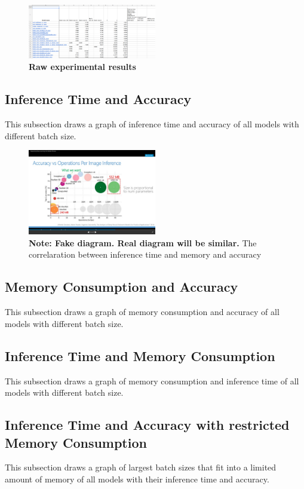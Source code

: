 \documentclass[conference]{IEEEtran}
\begin{document}
\begin{figure}[htpb]
	  \centering
	  \includegraphics[width=0.5\textwidth]{experimental_results}
	  \caption{\textbf{Raw experimental results}}
	  \label{fig:experimental_results}
\end{figure}

\subsection{Inference Time and Accuracy}
This subsection draws a graph of inference time and accuracy of all models with different batch size.

\begin{figure}[htpb]
	  \centering
	  \includegraphics[width=0.5\textwidth]{time-memory-accuracy}
	  \caption{\textbf{Note: Fake diagram. Real diagram will be similar.} The correlaration between inference time and memory and accuracy}
	  \label{fig:time-memory-accuracy}
\end{figure}


\subsection{Memory Consumption and Accuracy}
This subsection draws a graph of memory consumption and accuracy of all models with different batch size.

\subsection{Inference Time and Memory Consumption}
This subsection draws a graph of memory consumption and inference time of all models with different batch size.

\subsection{Inference Time and Accuracy with restricted Memory Consumption}
This subsection draws a graph of largest batch sizes that fit into a limited amount of memory of all models with their inference time and accuracy.
\end{document}
